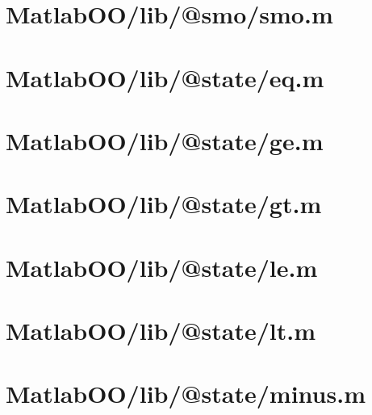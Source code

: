 \section{MatlabOO/lib/@smo/smo.m}\label{code:MatlabOO/lib/@smo/smo.m}


\pagebreak
\section{MatlabOO/lib/@state/eq.m}\label{code:MatlabOO/lib/@state/eq.m}


\pagebreak
\section{MatlabOO/lib/@state/ge.m}\label{code:MatlabOO/lib/@state/ge.m}


\pagebreak
\section{MatlabOO/lib/@state/gt.m}\label{code:MatlabOO/lib/@state/gt.m}


\pagebreak
\section{MatlabOO/lib/@state/le.m}\label{code:MatlabOO/lib/@state/le.m}


\pagebreak
\section{MatlabOO/lib/@state/lt.m}\label{code:MatlabOO/lib/@state/lt.m}


\pagebreak
\section{MatlabOO/lib/@state/minus.m}\label{code:MatlabOO/lib/@state/minus.m}


